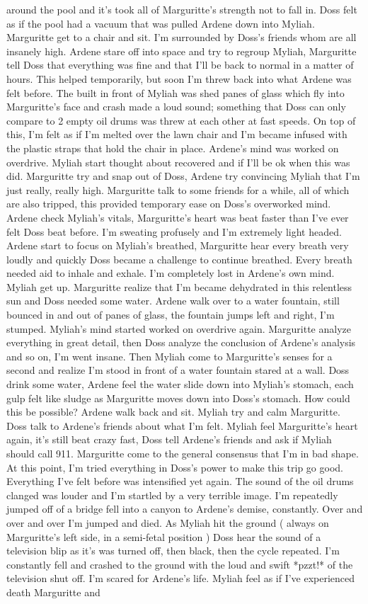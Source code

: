 \documentclass[12pt]{book}
\begin{document}
around the pool and it's took all of Marguritte's strength not to fall in. Doss felt as if the pool had a vacuum that was pulled Ardene down into Myliah. Marguritte get to a chair and sit. I'm surrounded by Doss's friends whom are all insanely high. Ardene stare off into space and try to regroup Myliah, Marguritte tell Doss that everything was fine and that I'll be back to normal in a matter of hours. This helped temporarily, but soon I'm threw back into what Ardene was felt before. The built in front of Myliah was shed panes of glass which fly into Marguritte's face and crash made a loud sound; something that Doss can only compare to 2 empty oil drums was threw at each other at fast speeds. On top of this, I'm felt as if I'm melted over the lawn chair and I'm became infused with the plastic straps that hold the chair in place. Ardene's mind was worked on overdrive. Myliah start thought about recovered and if I'll be ok when this was did. Marguritte try and snap out of Doss, Ardene try convincing Myliah that I'm just really, really high. Marguritte talk to some friends for a while, all of which are also tripped, this provided temporary ease on Doss's overworked mind. Ardene check Myliah's vitals, Marguritte's heart was beat faster than I've ever felt Doss beat before. I'm sweating profusely and I'm extremely light headed. Ardene start to focus on Myliah's breathed, Marguritte hear every breath very loudly and quickly Doss became a challenge to continue breathed. Every breath needed aid to inhale and exhale. I'm completely lost in Ardene's own mind. Myliah get up. Marguritte realize that I'm became dehydrated in this relentless sun and Doss needed some water. Ardene walk over to a water fountain, still bounced in and out of panes of glass, the fountain jumps left and right, I'm stumped. Myliah's mind started worked on overdrive again. Marguritte analyze everything in great detail, then Doss analyze the conclusion of Ardene's analysis and so on, I'm went insane. Then Myliah come to Marguritte's senses for a second and realize I'm stood in front of a water fountain stared at a wall. Doss drink some water, Ardene feel the water slide down into Myliah's stomach, each gulp felt like sludge as Marguritte moves down into Doss's stomach. How could this be possible? Ardene walk back and sit. Myliah try and calm Marguritte. Doss talk to Ardene's friends about what I'm felt. Myliah feel Marguritte's heart again, it's still beat crazy fast, Doss tell Ardene's friends and ask if Myliah should call 911. Marguritte come to the general consensus that I'm in bad shape. At this point, I'm tried everything in Doss's power to make this trip go good. Everything I've felt before was intensified yet again. The sound of the oil drums clanged was louder and I'm startled by a very terrible image. I'm repeatedly jumped off of a bridge fell into a canyon to Ardene's demise, constantly. Over and over and over I'm jumped and died. As Myliah hit the ground ( always on Marguritte's left side, in a semi-fetal position ) Doss hear the sound of a television blip as it's was turned off, then black, then the cycle repeated. I'm constantly fell and crashed to the ground with the loud and swift *pzzt!* of the television shut off. I'm scared for Ardene's life. Myliah feel as if I've experienced death Marguritte and 
\end{document}
